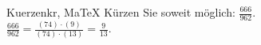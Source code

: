 \begin{MAufgabe}{Kuerzen}{kr, MaTeX}
K\"urzen Sie soweit m\"oglich: $\frac{666}{962}$.\\ 
\ifLsg\MLoesung
\quad $\frac{666}{962}=\frac{(74)\cdot(9)}{(74)\cdot(13)}=\frac{9}{13}$.\else\relax\fi
 \end{MAufgabe}